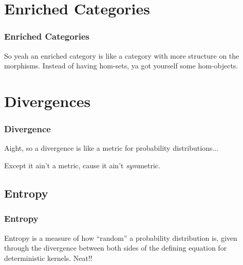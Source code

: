 \documentclass{beamer}
\begin{document}
\section{Enriched Categories}

\begin{frame}
	\frametitle{Enriched Categories}
	So yeah an enriched category is like a category with more structure on the morphisms.
	Instead of having hom-sets, ya got yourself some hom-objects.
\end{frame}

\section{Divergences}

\begin{frame}
	\frametitle{Divergence}
	Aight, so a divergence is like a metric for probability distributions...

	Except it ain't a metric, cause it ain't \emph{sym}metric.
\end{frame}

\subsection{Entropy}

\begin{frame}
	\frametitle{Entropy}
	Entropy is a measure of how ``random'' a probability distribution is, given through the divergence between both sides of the defining equation for deterministic kernels. Neat!!
\end{frame}
\end{document}
